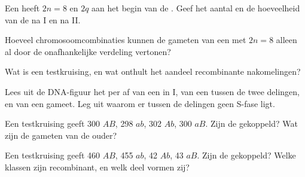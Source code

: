 \begin{exercise}[$\star$]\label{exo:g12:meiosis-genetic-shuffling:3}
Een  heeft $2n = 8$ en  $2q$ aan het begin van de . Geef het
aantal  en de hoeveelheid  van de  na  I en na
 II.
\end{exercise}

\begin{exercise}[$\star$]\label{exo:g12:meiosis-genetic-shuffling:4}
Hoeveel chromosoomcombinaties kunnen de gameten van een  met $2n = 8$
alleen al door de onafhankelijke verdeling vertonen?
\end{exercise}

\begin{exercise}[$\star$]\label{exo:g12:meiosis-genetic-shuffling:5}
Wat is een testkruising, en wat onthult het aandeel recombinante
nakomelingen?
\end{exercise}

\begin{exercise}[$\star\star$]\label{exo:g12:meiosis-genetic-shuffling:6}
Lees uit de DNA-figuur het  per  af van een  in  I, van een
 tussen de twee delingen, en van een gameet. Leg uit waarom er tussen
de delingen geen S-fase ligt.
\end{exercise}

\begin{exercise}[$\star\star$]\label{exo:g12:meiosis-genetic-shuffling:7}
Een testkruising geeft 300 $AB$, 298 $ab$, 302 $Ab$, 300 $aB$. Zijn de
 gekoppeld? Wat zijn de gameten van de ouder?
\end{exercise}

\begin{exercise}[$\star\star$]\label{exo:g12:meiosis-genetic-shuffling:8}
Een testkruising geeft 460 $AB$, 455 $ab$, 42 $Ab$, 43 $aB$. Zijn de 
gekoppeld? Welke klassen zijn recombinant, en welk deel vormen zij?
\end{exercise}

